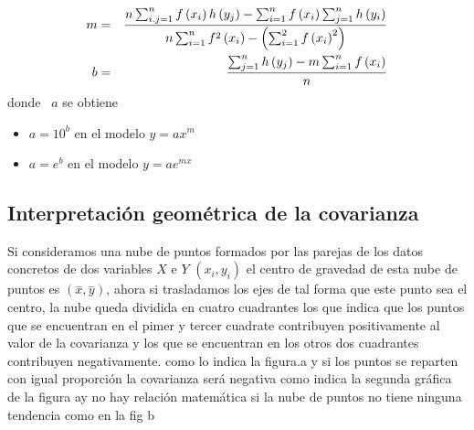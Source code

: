 \documentclass[12pt]{article}
\begin{document}
\begin{eqnarray*}
m &=&\frac{n\sum_{i.j=1}^{n}f\left( x_{i}\right) h\left( y_{j}\right)
-\sum_{i=1}^{n}f\left( x_{i}\right) \sum_{j=1}^{n}h\left( y_{i}\right) }{%
n\sum_{i=1}^{n}f^{2}\left( x_{i}\right) -\left( \sum_{i=1}^{2}f\left(
x_{i}\right) ^{2}\right) } \\
b &=&\frac{\sum_{j=1}^{n}h\left( y_{j}\right) -m\sum_{i=1}^{n}f\left(
x_{i}\right) }{n}
\end{eqnarray*}
donde \ $a$ se obtiene

\begin{itemize}
\item  $a=10^{b}$ en el modelo $y=ax^{m}$

\item  $a=e^{b}$ en el modelo $y=ae^{mx}$
\end{itemize}

\subsection{Interpretaci\'{o}n geom\'{e}trica de la covarianza}

Si consideramos una nube de puntos formados por las parejas de los datos
concretos de dos variables $X$ e $Y$ $\left( x_{i},y_{i}\right) $ el centro
de gravedad de esta nube de puntos es $\left( \overset{-}{x},\overset{-}{y}%
\right) $, ahora si trasladamos los ejes de tal forma que este punto sea el
centro, la nube queda dividida en cuatro cuadrantes los que indica que los
puntos que se encuentran en el pimer y tercer cuadrate contribuyen
positivamente al valor de la covarianza y los que se encuentran en los otros
dos cuadrantes contribuyen negativamente. como lo indica la figura.a y si
los puntos se reparten con igual proporci\'{o}n la covarianza ser\'{a}
negativa como indica la segunda gr\'{a}fica de la figura ay no hay relaci\'{o}n matem\'{a}tica si la nube de puntos no tiene
ninguna tendencia como en la fig b
\end{document}
